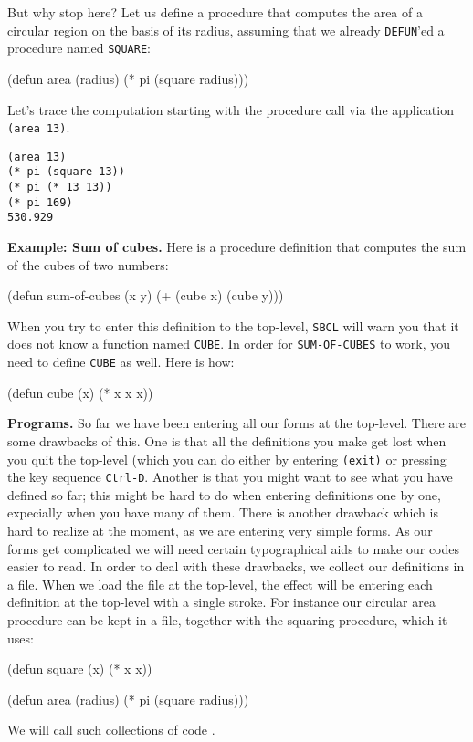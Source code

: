 \documentclass[a4paper,11pt]{article}
\begin{document}
\begin{uenum}
But why stop here? Let us define a procedure that computes the area of a circular region on the basis of its radius, assuming that we already \Verb+DEFUN+'ed a procedure named \Verb+SQUARE+:

\begin{lispcode}
(defun area (radius) (* pi (square radius)))
\end{lispcode}

Let's trace the computation starting with the procedure call via the application \Verb+(area 13)+.

\begin{ucodeframe}
\begin{Verbatim}
(area 13)
(* pi (square 13))
(* pi (* 13 13))
(* pi 169)
530.929
\end{Verbatim}
\end{ucodeframe}


\item {\bf Example: Sum of cubes.} Here is a procedure definition that computes the sum of the cubes of two numbers:

\begin{lispcode}
(defun sum-of-cubes (x y) (+ (cube x) (cube y)))
\end{lispcode}

When you try to enter this definition to the top-level, \Verb+SBCL+ will warn you that it does not know a function named \Verb+CUBE+. In order for \Verb+SUM-OF-CUBES+ to work, you need to define \Verb+CUBE+ as well. Here is how:   

\begin{lispcode}
(defun cube (x) (* x x x))
\end{lispcode}

\item {\bf Programs.} So far we have been entering all our forms at the top-level. There are some drawbacks of this. One is that all the definitions you make get lost when you quit the top-level (which you can do either by entering \Verb+(exit)+ or pressing the key sequence \Verb+Ctrl-D+. Another is that you might want to see what you have defined so far; this might be hard to do when entering definitions one by one, expecially when you have many of them. There is another drawback which is hard to realize at the moment, as we are entering very simple forms. As our forms get complicated we will need certain typographical aids to make our codes easier to read. In order to deal with these drawbacks, we collect our definitions in a file. When we load the file at the top-level, the effect will be entering each definition at the top-level with a single stroke. For instance our circular area procedure can be kept in a file, together with the squaring procedure, which it uses:   
 
\begin{lispcode}
(defun square (x)
  (* x x))

(defun area (radius)
  (* pi (square radius)))
\end{lispcode}

We will call such collections of code .

\end{uenum}
\end{document}
